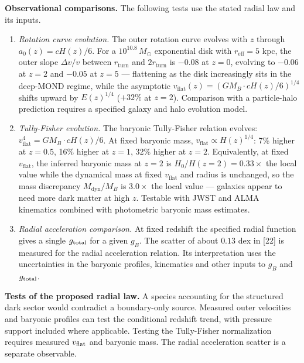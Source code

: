 \documentclass[
]{article}
\begin{document}
\textbf{Observational comparisons.} The following tests use the stated
radial law and its inputs.

\begin{enumerate}
\def\labelenumi{(\roman{enumi})}
\item
  \emph{Rotation curve evolution.} The outer rotation curve evolves with
  \(z\) through \(a_0(z) = cH(z)/6\). For a \(10^{10.8}\,M_\odot\)
  exponential disk with \(r_{\text{eff}} = 5\) kpc, the outer slope
  \(\Delta v / v\) between \(r_{\text{turn}}\) and \(2r_{\text{turn}}\)
  is \(-0.08\) at \(z = 0\), evolving to \(-0.06\) at \(z = 2\) and
  \(-0.05\) at \(z = 5\) --- flattening as the disk increasingly sits in
  the deep-MOND regime, while the asymptotic
  \(v_{\text{flat}}(z) = (GM_B \cdot cH(z)/6)^{1/4}\) shifts upward by
  \(E(z)^{1/4}\) (\(+32\%\) at \(z = 2\)). Comparison with a
  particle-halo prediction requires a specified galaxy and halo
  evolution model.
\item
  \emph{Tully-Fisher evolution.} The baryonic Tully-Fisher relation
  evolves: \(v_{\text{flat}}^4 = GM_B \cdot cH(z)/6\). At fixed baryonic
  mass, \(v_{\text{flat}} \propto H(z)^{1/4}\): 7\% higher at
  \(z = 0.5\), 16\% higher at \(z = 1\), 32\% higher at \(z = 2\).
  Equivalently, at fixed \(v_{\text{flat}}\), the inferred baryonic mass
  at \(z = 2\) is \(H_0/H(z=2) = 0.33\times\) the local value while the
  dynamical mass at fixed \(v_{\text{flat}}\) and radius is unchanged,
  so the mass discrepancy \(M_{\text{dyn}}/M_B\) is \(3.0\times\) the
  local value --- galaxies appear to need more dark matter at high
  \(z\). Testable with JWST and ALMA kinematics combined with
  photometric baryonic mass estimates.
\item
  \emph{Radial acceleration comparison.} At fixed redshift the specified
  radial function gives a single \(g_{\rm total}\) for a given \(g_B\).
  The scatter of about \(0.13\) dex in {[}22{]} is measured for the
  radial acceleration relation. Its interpretation uses the
  uncertainties in the baryonic profiles, kinematics and other inputs to
  \(g_B\) and \(g_{\rm total}\).
\end{enumerate}

\textbf{Tests of the proposed radial law.} A species accounting for the
structured dark sector would contradict a boundary-only source. Measured
outer velocities and baryonic profiles can test the conditional redshift
trend, with pressure support included where applicable. Testing the
Tully-Fisher normalization requires measured \(v_{\rm flat}\) and
baryonic mass. The radial acceleration scatter is a separate observable.
\end{document}
